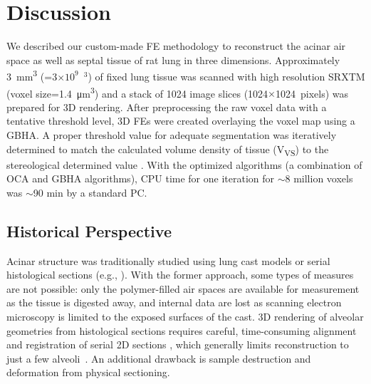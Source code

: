 \section{Discussion}\label{sec:discussion}
We described our custom-made FE methodology to reconstruct the acinar air space as well as septal tissue of rat lung in three dimensions. Approximately \SI{3}{\milli\meter\cubed} (=3$\times10^9$~\micro\meter$^3$) of fixed lung tissue was scanned with high resolution SRXTM (voxel size=\SI{1.4}{\micro\meter\cubed}) and a stack of 1024 image slices (1024$\times$1024~pixels) was prepared for 3D rendering. After preprocessing the raw voxel data with a tentative threshold level, 3D FEs were created overlaying the voxel map using a GBHA. A proper threshold value for adequate segmentation was iteratively determined to match the calculated volume density of tissue (V\textsubscript{VS}) to the stereological determined value \cite{Tschanz2003}. With the optimized algorithms (a combination of OCA and GBHA algorithms), CPU time for one iteration for $\sim$8 million voxels was $\sim$90 min by a standard PC.

\subsection{Historical Perspective}
Acinar structure was traditionally studied using lung cast models \cite{Boyden1971,Haefeli1988,Schreider1981} or serial histological sections (e.g., \cite{Berend1991,Hansen1975,Hansen1975a,Parker1971,Randell1989}). With the former approach, some types of measures are not possible: only the polymer-filled air spaces are available for measurement as the tissue is digested away, and internal data are lost as scanning electron microscopy is limited to the exposed surfaces of the cast. 3D rendering of alveolar geometries from histological sections requires careful, time-consuming alignment and registration of serial 2D sections \cite{Mercer1987,Mercer1987a,Stelter1966}, which generally limits reconstruction to just a few alveoli~\cite{Mercer1987}. An additional drawback is sample destruction and deformation from physical sectioning.

